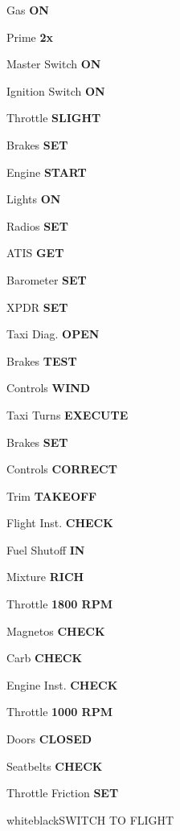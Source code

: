 \documentclass{article}
\begin{document}
\begin{multicols*}{3}
Gas \dotfill \textbf{ON}

\colorbox{orange!80}{}

Prime \dotfill \textbf{2x}

Master Switch \dotfill \textbf{ON}

Ignition Switch \dotfill \textbf{ON}

Throttle \dotfill \textbf{SLIGHT}

Brakes \dotfill \textbf{SET}

Engine \dotfill \textbf{START}

Lights \dotfill \textbf{ON}

Radios \dotfill \textbf{SET}

ATIS \dotfill \textbf{GET}

Barometer \dotfill \textbf{SET}

XPDR \dotfill \textbf{SET}

Taxi Diag. \dotfill \textbf{OPEN}

\colorbox{green!80!red}{}

Brakes \dotfill \textbf{TEST}

Controls \dotfill \textbf{WIND}

Taxi Turns \dotfill \textbf{EXECUTE}

\colorbox{green!80!red}{}

Brakes \dotfill \textbf{SET}

Controls \dotfill \textbf{CORRECT}

Trim \dotfill \textbf{TAKEOFF}

Flight Inst. \dotfill \textbf{CHECK}

Fuel Shutoff \dotfill \textbf{IN}

Mixture \dotfill \textbf{RICH}

Throttle \dotfill \textbf{1800 RPM}

Magnetos \dotfill \textbf{CHECK}

Carb \dotfill \textbf{CHECK}

Engine Inst. \dotfill \textbf{CHECK}

Throttle \dotfill \textbf{1000 RPM}

Doors \dotfill \textbf{CLOSED}

Seatbelts \dotfill \textbf{CHECK}

Throttle Friction \dotfill \textbf{SET} \\

\begin{groupheading}{white}{black}{SWITCH TO FLIGHT}
\end{groupheading}


\end{multicols*}
\end{document}
